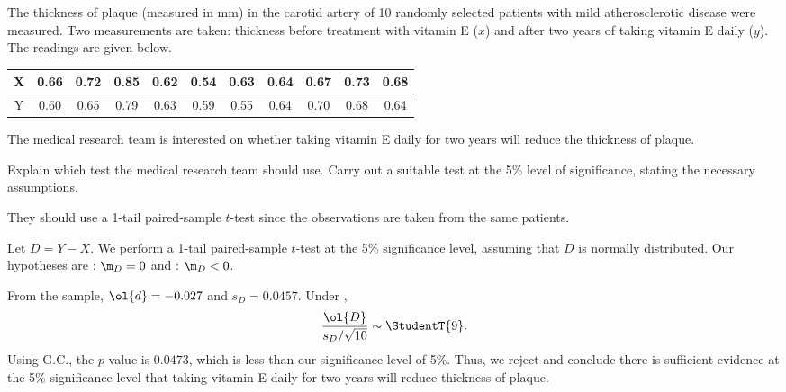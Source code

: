 \begin{problem}
    The thickness of plaque (measured in mm) in the carotid artery of 10 randomly selected patients with mild atherosclerotic disease were measured. Two measurements are taken: thickness before treatment with vitamin E ($x$) and after two years of taking vitamin E daily ($y$). The readings are given below.

    \begin{table}[H]
        \centering
        \begin{tabular}{|c|c|c|c|c|c|c|c|c|c|c|}
            \hline
            X & 0.66 & 0.72 & 0.85 & 0.62 & 0.54 & 0.63 & 0.64 & 0.67 & 0.73 & 0.68 \\ \hline
            Y & 0.60 & 0.65 & 0.79 & 0.63 & 0.59 & 0.55 & 0.64 & 0.70 & 0.68 & 0.64 \\ \hline
        \end{tabular}
    \end{table}

    The medical research team is interested on whether taking vitamin E daily for two years will reduce the thickness of plaque.  

    Explain which test the medical research team should use. Carry out a suitable test at the 5\% level of significance, stating the necessary assumptions.
\end{problem}
\begin{solution}
    They should use a 1-tail paired-sample $t$-test since the observations are taken from the same patients.

    Let $D = Y - X$. We perform a 1-tail paired-sample $t$-test at the 5\% significance level, assuming that $D$ is normally distributed. Our hypotheses are \nullhyp: $\m_D = 0$ and \althyp: $\m_D < 0$.

    From the sample, $\ol{d} = -0.027$ and $s_D = 0.0457$. Under \nullhyp, \[\frac{\ol{D}}{s_D / \sqrt{10}} \sim \StudentT{9}.\] Using G.C., the $p$-value is $0.0473$, which is less than our significance level of 5\%. Thus, we reject \nullhyp{} and conclude there is sufficient evidence at the 5\% significance level that taking vitamin E daily for two years will reduce thickness of plaque.
\end{solution}


